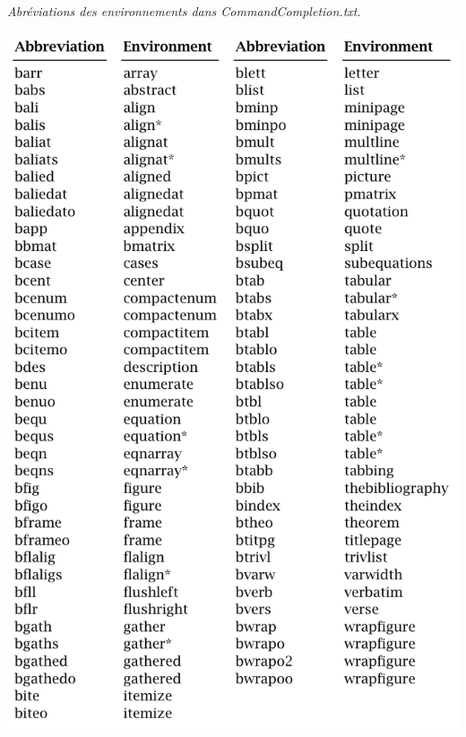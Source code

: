 \documentclass[12pt,french]{article}
\begin{document}
\begin{table}[htbp]
\centering
\caption{\emph{Abréviations des environnements dans \textsf{CommandCompletion.txt}}.}
\includegraphics[scale=.74]{tbl1}
\label{tbl1}
\end{table}
\end{document}
